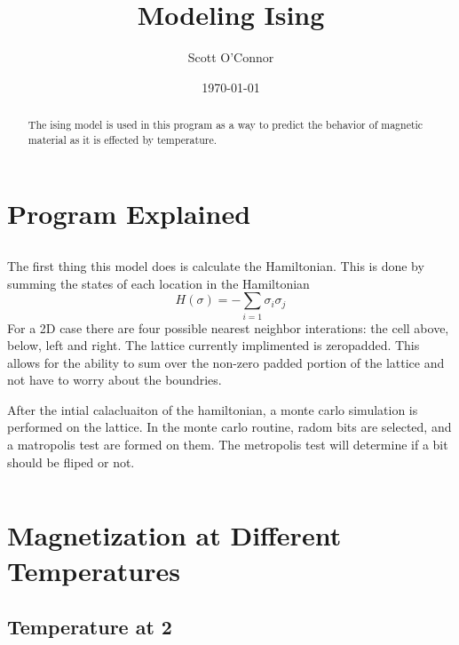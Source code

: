 \documentclass[]{article}
\begin{document}
\title{Modeling Ising}
\author{Scott O'Connor}
\date{\today} 
\maketitle

  \begin{abstract}
  The ising model is used in this program as a way to predict the behavior of magnetic material as it is effected by temperature. 
  \end{abstract}

\section{Program Explained}
  \subsection{}
  The first thing this model does is calculate the Hamiltonian.
  This is done by summing the states of each location in the Hamiltonian
  \begin{equation}
      H(\sigma) = - \sum_{i=1} \sigma_i \sigma_j 
  \end{equation}
  For a 2D case there are four possible nearest neighbor interations: the cell above, below, left and right.
  The lattice currently implimented is zeropadded. This allows for the ability to sum over the non-zero padded portion of the lattice and not have to worry about the boundries. 

  After the intial calacluaiton of the hamiltonian, a monte carlo simulation is performed on the lattice. In the monte carlo routine, radom bits are selected, and a matropolis test are formed on them.
  The metropolis test will determine if a bit should be fliped or not.

  \begin{equation}
      
  \end{equation}


\section{Magnetization at Different Temperatures} 
    \label{sec:level1} 

    \subsection{\label{sec:level2} Temperature at 2}
\end{document}
